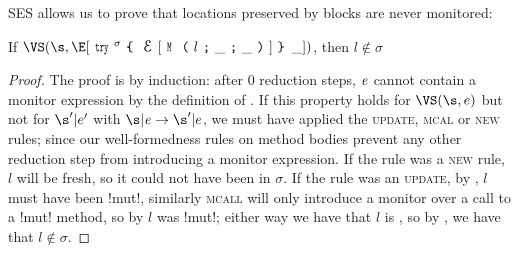 
SES allows us to prove that locations preserved by \Q@try@ blocks are never monitored:
\SS\begin{Lemma}\rm
	If $\VS(\s, \E[\Kw{try}^\sigma\oC\ctx[\M{l}{\_}{\_}]\cC\,\_])$, then $l\notin\sigma$
\end{Lemma}
\begin{proof}
The proof is by induction: after 0 reduction steps, ${\mathit{e}}$ cannot contain a monitor expression by the definition of \VS. If this property holds for $\VS(\s, e)$ but not for $\s'|e'$ with $\s|\e\rightarrow \s'|e$, we must have applied the \textsc{update}, \textsc{mcal} or \textsc{new} rules; since our well-formedness rules on method bodies prevent any other reduction step from introducing a monitor expression. If the rule was a \textsc{new} rule, $l$ will be fresh, so it could not have been in $\sigma$. If the rule was an \textsc{update}, by , $l$ must have been \Q!mut!, similarly \textsc{mcall} will only introduce a monitor over a call to a \Q!mut! method, so by  $l$ was \Q!mut!; either way we have that $l$ is \tmuty, so by , we have that $l \notin \sigma$.
\end{proof}




